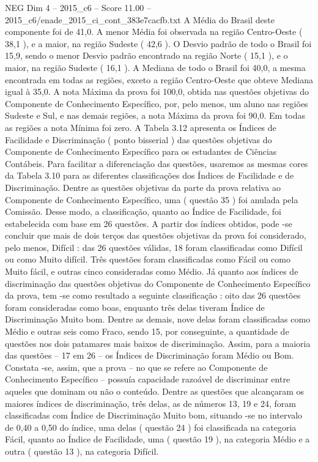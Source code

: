 \begin{textsample}{NEG Dim 4 – 2015\_c6 – Score 11.00 – 2015\_c6/enade\_2015\_ci\_cont\_383e7cacfb.txt}
A Média do Brasil deste componente foi de 41,0.
A menor Média foi observada na região Centro-Oeste ( 38,1 ), e a maior, na região Sudeste ( 42,6 ).
O Desvio padrão de todo o Brasil foi 15,9, sendo o menor Desvio padrão encontrado na região Norte ( 15,1 ), e o maior, na região Sudeste ( 16,1 ).
A Mediana de todo o Brasil foi 40,0, a mesma encontrada em todas as regiões, exceto a região Centro-Oeste que obteve Mediana igual à 35,0.
A nota Máxima da prova foi 100,0, obtida nas questões objetivas do Componente de Conhecimento Específico, por, pelo menos, um aluno nas regiões Sudeste e Sul, e nas demais regiões, a nota Máxima da prova foi 90,0.
Em todas as regiões a nota Mínima foi zero.
A Tabela 3.12 apresenta os Índices de Facilidade e Discriminação ( ponto bisserial ) das questões objetivas do Componente de Conhecimento Específico para os estudantes de Ciências Contábeis.
Para facilitar a diferenciação das questões, usaremos as mesmas cores da Tabela 3.10 para as diferentes classificações dos Índices de Facilidade e de Discriminação.
Dentre as questões objetivas da parte da prova relativa ao Componente de Conhecimento Específico, uma ( questão 35 ) foi anulada pela Comissão.
Desse modo, a classificação, quanto ao Índice de Facilidade, foi estabelecida com base em 26 questões.
A partir dos índices obtidos, pode -se concluir que mais de dois terços das questões objetivas da prova foi considerado, pelo menos, Difícil : das 26 questões válidas, 18 foram classificadas como Difícil ou como Muito difícil.
Três questões foram classificadas como Fácil ou como Muito fácil, e outras cinco consideradas como Médio.
Já quanto aos índices de discriminação das questões objetivas do Componente de Conhecimento Específico da prova, tem -se como resultado a seguinte classificação : oito das 26 questões foram consideradas como boas, enquanto três delas tiveram Índice de Discriminação Muito bom.
Dentre as demais, nove delas foram classificadas como Médio e outras seis como Fraco, sendo 15, por conseguinte, a quantidade de questões nos dois patamares mais baixos de discriminação.
Assim, para a maioria das questões – 17 em 26 – os Índices de Discriminação foram Médio ou Bom.
Constata -se, assim, que a prova – no que se refere ao Componente de Conhecimento Específico – possuía capacidade razoável de discriminar entre aqueles que dominam ou não o conteúdo.
Dentre as questões que alcançaram os maiores índices de discriminação, três delas, as de números 13, 19 e 24, foram classificadas com Índice de Discriminação Muito bom, situando -se no intervalo de 0,40 a 0,50 do índice, uma delas ( questão 24 ) foi classificada na categoria Fácil, quanto ao Índice de Facilidade, uma ( questão 19 ), na categoria Médio e a outra ( questão 13 ), na categoria Difícil.

\end{textsample}

